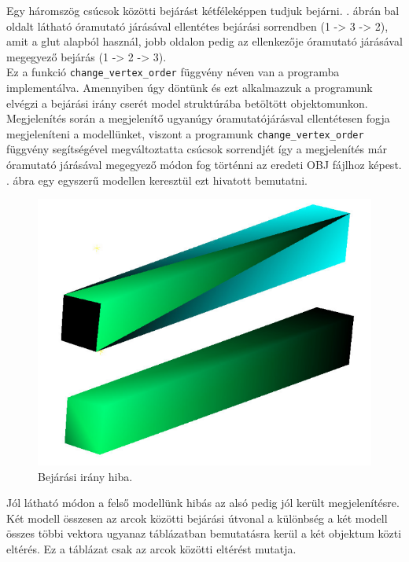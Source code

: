 Egy háromszög csúcsok közötti bejárást kétféleképpen tudjuk bejárni. . ábrán bal oldalt látható  óramutató járásával ellentétes bejárási sorrendben (1 -> 3 -> 2), amit a glut alapból használ, jobb oldalon pedig az ellenkezője óramutató járásával megegyező bejárás (1 -> 2 -> 3).\\

Ez a funkció \texttt{change\_vertex\_order} függvény néven van a programba implementálva. Amennyiben úgy döntünk és ezt alkalmazzuk a programunk elvégzi a bejárási irány cserét model struktúrába betöltött objektomunkon.\\

Megjelenítés során a megjelenítő ugyanúgy óramutatójárásval ellentétesen fogja megjeleníteni a modellünket, viszont a programunk \texttt{change\_vertex\_order} függvény segítségével megváltoztatta csúcsok sorrendjét így a megjelenítés már óramutató járásával megegyező módon fog történni az eredeti OBJ fájlhoz képest.\\
\newpage
{}. ábra egy egyszerű modellen keresztül ezt hivatott bemutatni.
\bigskip
\begin{figure}[h]
\centering
\includegraphics[scale=0.5]{images/order.png}
\caption{Bejárási irány hiba.}
\label{fig:bej2}
\end{figure}
\bigskip

Jól látható módon a felső modellünk hibás az alsó pedig jól került megjelenítésre. Két modell összesen az arcok közötti bejárási útvonal a különbség a két modell összes többi vektora ugyanaz  táblázatban bemutatásra kerül a két objektum közti eltérés. Ez a táblázat csak az arcok közötti eltérést mutatja.

